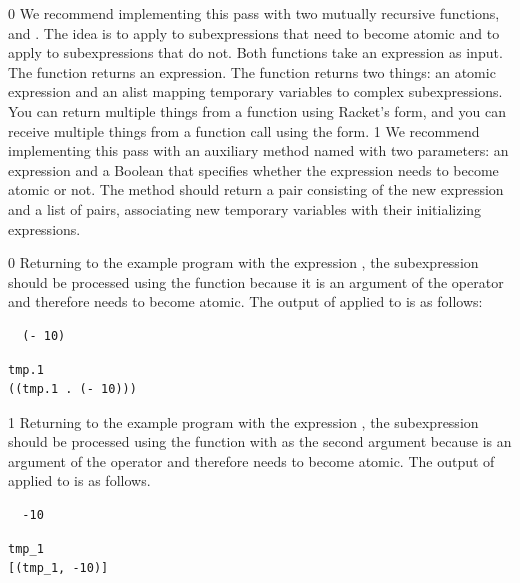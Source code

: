 \documentclass[7x10]{TimesAPriori_MIT}%
\def\racketEd{0}
\def\pythonEd{1}
\def\edition{1}
\newcommand{\pythonColor}[0]{}
\numberwithin{theorem}{chapter}
\numberwithin{definition}{chapter}
\numberwithin{equation}{chapter}
\begin{document}
{\if\edition\racketEd
We recommend implementing this pass with two mutually recursive
functions,  and . The idea is to apply
 to subexpressions that need to become atomic and to
apply  to subexpressions that do not.  Both functions
take an \LangVar{} expression as input.  The  function
returns an expression.  The  function returns two
things: an atomic expression and an alist mapping temporary variables to
complex subexpressions. You can return multiple things from a function
using Racket's  form, and you can receive multiple things
from a function call using the  form.
\fi}
%
{\if\edition\pythonEd\pythonColor
%
We recommend implementing this pass with an auxiliary method named
 with two parameters: an \LangVar{} expression and a
Boolean that specifies whether the expression needs to become atomic
or not.  The  method should return a pair consisting of
the new expression and a list of pairs, associating new temporary
variables with their initializing expressions.
%
\fi}

{\if\edition\racketEd
%
Returning to the example program with the expression , the subexpression  should be processed using the
 function because it is an argument of the \code{+}
operator and therefore needs to become atomic.  The output of
 applied to  is as follows:
\begin{transformation}
\begin{lstlisting}
  (- 10)
\end{lstlisting}
\compilesto
\begin{lstlisting}
tmp.1
((tmp.1 . (- 10)))
\end{lstlisting}
\end{transformation}
\fi}
%
{\if\edition\pythonEd\pythonColor
%
Returning to the example program with the expression ,
the subexpression  should be processed using the
 function with  as the second argument
because  is an argument of the \code{+} operator and
therefore needs to become atomic.  The output of 
applied to  is as follows.
\begin{transformation}
\begin{lstlisting}
  -10
\end{lstlisting}
\compilesto
\begin{lstlisting}
tmp_1
[(tmp_1, -10)]
\end{lstlisting}
\end{transformation}
%  
\fi}
\end{document}
